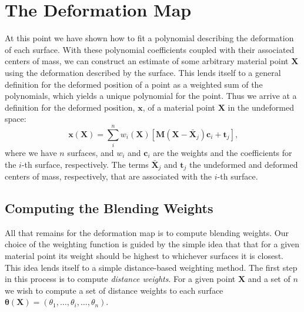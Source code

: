 \section{The Deformation Map}
At this point we have shown how to fit a polynomial describing the deformation of each surface. With these polynomial coefficients coupled with their associated centers of mass, we can construct an estimate of some arbitrary material point $\mathbf{X}$ using the deformation described by the surface. This lends itself to a general definition for the deformed position of a point as a weighted sum of the polynomials, which yields a unique polynomial for the point. Thus we arrive at a definition for the deformed position, $\mathbf{x}$, of a material point $\mathbf{X}$ in the undeformed space:
\begin{equation}
	\mathbf{x}(\mathbf{X}) = \sum_i^n w_i(\mathbf{X}) \left[ \mathbf{M}(\mathbf{X-\bar{X}}_j)\mathbf{c}_i + \mathbf{t}_j \right]
	\text{,}
\end{equation}
where we have $n$ surfaces, and $w_i$ and $\mathbf{c}_i$ are the weights and the coefficients for the $i$-th surface, respectively. The terms $\mathbf{\bar{X}}_j$ and $\mathbf{t}_j$ the undeformed and deformed centers of mass, respectively, that are associated with the $i$-th surface.

\subsection{Computing the Blending Weights}
All that remains for the deformation map is to compute blending weights. Our choice of the weighting function is guided by the simple idea that that for a given material point its weight should be highest to whichever surfaces it is closest. This idea lends itself to a simple distance-based weighting method. The first step in this process is to compute \textit{distance weights}. For a given point $\mathbf{X}$ and a set of $n$ we wish to compute a set of distance weights to each surface $\mathbf{\theta}(\mathbf{X}) = \left(\theta_1, \dots, \theta_i, \dots, \theta_n \right)$.

